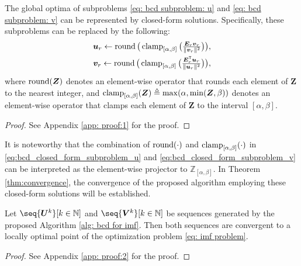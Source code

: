 \begin{theorem} \label{the: bcd subproblem}
    The global optima of subproblems \eqref{eq: bcd subproblem: u} and \eqref{eq: bcd subproblem: v} can be represented by closed-form solutions. Specifically, these subproblems can be replaced by the following:
    \begin{align} 
            \textstyle \bm{u}_r \gets \operatorname{round}\big(\operatorname{clamp}_{[\alpha,\beta]}\big(\frac{\bm{E}_r \bm{v}_r}{\lVert \bm{v}_r \rVert^2}\big)\big), \label{eq:bcd_closed_form_subproblem_u}\\
            \textstyle \bm{v}_r \gets \operatorname{round}\big(\operatorname{clamp}_{[\alpha,\beta]}\big(\frac{\bm{E}_r^\mathsf{T} \bm{u}_r}{\lVert \bm{u}_r \rVert^2}\big)\big),             
        \label{eq:bcd_closed_form_subproblem_v}
    \end{align}
    where $\operatorname{round}(\bm{Z})$ denotes an element-wise operator that rounds each element of $\bm{Z}$ to the nearest integer, and $\operatorname{clamp}_{[\alpha,\beta]}(\bm{Z}) \triangleq \max(\alpha, \min(\bm{Z}, \beta))$ denotes an element-wise operator that clamps each element of $\bm{Z}$ to the interval $[\alpha,\beta]$.
\end{theorem}
\begin{proof}
	See Appendix \ref{app: proof:1} for the proof.
\end{proof}

It is noteworthy that the combination of $\operatorname{round}(\cdot)$ and $\operatorname{clamp}_{[\alpha,\beta]}(\cdot)$ in \eqref{eq:bcd_closed_form_subproblem_u} and \eqref{eq:bcd_closed_form_subproblem_v} can be interpreted as the element-wise projector to $\mathbb{Z}_{[\alpha,\beta]}$. In Theorem \ref{thm:convergence}, the convergence of the proposed algorithm employing these closed-form solutions will be established.
\bigskip
\begin{theorem}\label{thm:convergence}
    Let $\seq{\bm U^k}[k\in\N]$ and $\seq{\bm V^k}[k\in\N]$ be sequences generated by the proposed Algorithm \ref{alg: bcd for imf}. Then both sequences are convergent to a locally optimal point of the optimization problem \eqref{eq: imf problem}.
\end{theorem}
\begin{proof}
    See Appendix \ref{app: proof:2} for the proof.
\end{proof}




